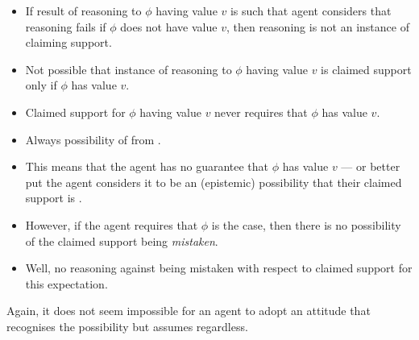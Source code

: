   \begin{note}
  \begin{itemize}
  \item If result of reasoning to \(\phi\) having value \(v\) is such that agent considers that reasoning fails if \(\phi\) does not have value \(v\), then reasoning is not an instance of claiming support.
  \item Not possible that instance of reasoning to \(\phi\) having value \(v\) is claimed support only if \(\phi\) has value \(v\).
  \item Claimed support for \(\phi\) having value \(v\) never requires that \(\phi\) has value \(v\).
  \end{itemize}
\end{note}

\begin{note}
  \color{red}
    \begin{itemize}
    \item Always possibility of \mom{} from \nfcs{}.
    \item This means that the agent has no guarantee that \(\phi\) has value \(v\) --- or better put the agent considers it to be an (epistemic) possibility that their claimed support is \mom{}.
    \item However, if the agent requires that \(\phi\) is the case, then there is no possibility of the claimed support being \emph{mistaken}.
    \item Well, no reasoning against being mistaken with respect to claimed support for this expectation.
  \end{itemize}

  Again, it does not seem impossible for an agent to adopt an attitude that recognises the possibility but assumes regardless.
\end{note}

